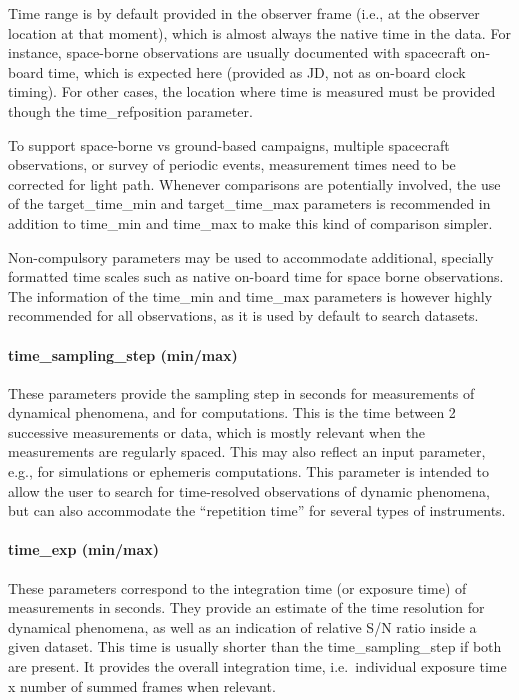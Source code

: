 \documentclass[11pt,a4paper]{ivoa}
\begin{document}
Time range is by default provided in the observer frame (i.e., at the
observer location at that moment), which is almost always the native time
in the data. For instance, space-borne observations are usually documented
with spacecraft on-board time, which is expected here (provided as JD,
not as on-board clock timing). For other cases, the location where time
is measured must be provided though the time\_refposition parameter.

To support space-borne vs ground-based campaigns, multiple spacecraft
observations, or survey of periodic events, measurement times need to be
corrected for light path. Whenever comparisons are potentially involved,
the use of the target\_time\_min and target\_time\_max parameters is
recommended in addition to time\_min and time\_max to make this kind of
comparison simpler.

Non-compulsory parameters may be used to accommodate additional,
specially formatted time scales such as native on-board time for space
borne observations. The information of the time\_min and time\_max
parameters is however highly recommended for all observations,
as it is used by default to search datasets.

\paragraph{time\_sampling\_step (min/max)}

These parameters provide the sampling step in seconds for measurements
of dynamical phenomena, and for computations. This is the time between
2 successive measurements or data, which is mostly relevant when the
measurements are regularly spaced. This may also reflect an input
parameter, e.g., for simulations or ephemeris computations. This
parameter is intended to allow the user to search for time-resolved
observations of dynamic phenomena, but can also accommodate the
``repetition time'' for several types of instruments.

\paragraph{time\_exp (min/max)}

These parameters correspond to the integration time (or exposure
time) of measurements in seconds. They provide an estimate of the time
resolution for dynamical phenomena, as well as an indication of relative
S/N ratio inside a given dataset. This time is usually shorter than
the time\_sampling\_step if both are present. It provides the overall
integration time, i.e.\ individual exposure time x number of summed
frames when relevant.
\end{document}
